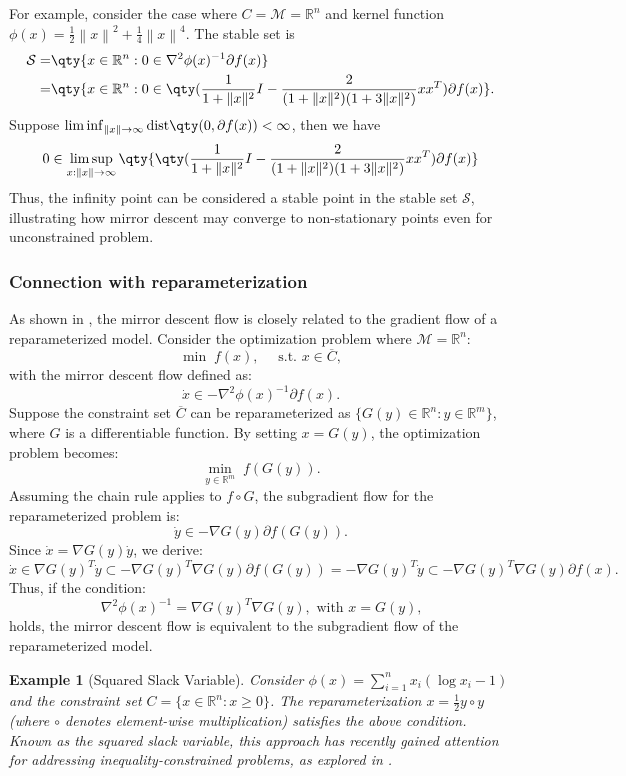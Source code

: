 \documentclass[11pt]{article}
\newcommand{\R}{\mathbb R}
\newcommand{\cM}{\mathcal M}
\newcommand{\cS}{\mathcal S}
\def\norm#1{\left\|#1\right\|}
\newtheorem{example}{Example}[section]
\def\dist{{\rm dist}}
\begin{document}
For example, consider the case where $C=\cM=\R^n$ and kernel function $\phi(x)=\frac{1}{2}\norm{x}^2+\frac{1}{4}\norm{x}^4$.
The stable set is 
\[
\begin{aligned}
\cS=&\qty{x\in\R^n:0\in\nabla^2\phi(x)^{-1}\partial f(x)}\\
=&\qty{x\in\R^n:0\in\qty(\frac{1}{1 + \|x\|^2} I - \frac{2}{(1 + \|x\|^2)(1 + 3 \|x\|^2)} x x^T)\partial f(x)}.
\end{aligned}
\]
Suppose $\liminf_{\norm{x}\to\infty}\dist\qty(0,\partial f(x))<\infty$, then we have
\[
0\in\limsup_{x:\norm{x}\to\infty}\qty{\qty(\frac{1}{1 + \|x\|^2} I - \frac{2}{(1 + \|x\|^2)(1 + 3 \|x\|^2)} x x^T)\partial f(x)}
\]
Thus, the infinity point can be considered a stable point in the stable set \(\mathcal{S}\), illustrating how mirror descent may converge to non-stationary points even for unconstrained problem.


\subsubsection{Connection with reparameterization}
As shown in \cite{li2022implicit}, the mirror descent flow is closely related to the gradient flow of a reparameterized model. Consider the optimization problem where $ \mathcal{M} = \mathbb{R}^n $:
\[
\min\;f(x),\quad\text{ s.t. } x\in\overline{C},
\]
with the mirror descent flow defined as:
\[
\dot x\in-\nabla^2\phi(x)^{-1}\partial f(x).
\]
Suppose the constraint set $ \overline{C} $ can be reparameterized as $ \{ G(y) \in \mathbb{R}^n : y \in \mathbb{R}^m \} $, where $ G $ is a differentiable function. By setting $ x = G(y) $, the optimization problem becomes:
\[
\min_{y\in\R^m}\;f(G(y)).
\]
Assuming the chain rule applies to $ f \circ G $, the subgradient flow for the reparameterized problem is:
\[
\dot y\in-\nabla G(y)\partial f(G(y)).
\]
Since $ \dot{x} = \nabla G(y) \dot{y} $, we derive:
\[
\dot x\in\nabla G(y)^T\dot y\subset-\nabla G(y)^T\nabla G(y)\partial f(G(y))=-\nabla G(y)^T\dot y\subset-\nabla G(y)^T\nabla G(y)\partial f(x).
\] 
Thus, if the condition:
\begin{equation}
\nabla^2\phi(x)^{-1}=\nabla G(y)^T\nabla G(y), \text{ with $x=G(y)$,}
\label{eq:equiv_repara_mirror}
\end{equation}
holds, the mirror descent flow is equivalent to the subgradient flow of the reparameterized model.

\begin{example}[Squared Slack Variable]
Consider $ \phi(x) = \sum_{i=1}^n x_i (\log x_i - 1) $ and the constraint set $ C = \{ x \in \mathbb{R}^n : x \geq 0 \} $. The reparameterization $ x = \frac{1}{2} y \circ y $ (where $ \circ $ denotes element-wise multiplication) satisfies the above condition. Known as the squared slack variable, this approach has recently gained attention for addressing inequality-constrained problems, as explored in \cite{kolb2023smoothing,ding2023squared,tang2024optimization}.  
\end{example}
\end{document}
